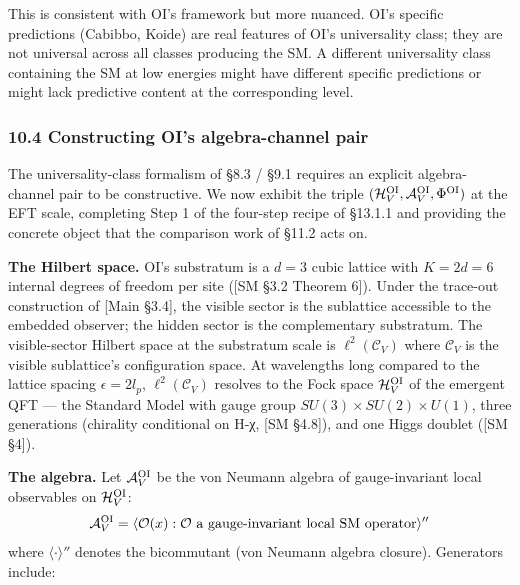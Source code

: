 \documentclass[
]{article}
\begin{document}
This is consistent with OI's framework but more nuanced. OI's specific
predictions (Cabibbo, Koide) are real features of OI's universality
class; they are not universal across all classes producing the SM. A
different universality class containing the SM at low energies might
have different specific predictions or might lack predictive content at
the corresponding level.

\hypertarget{constructing-ois-algebra-channel-pair}{%
\subsubsection{10.4 Constructing OI's algebra-channel
pair}\label{constructing-ois-algebra-channel-pair}}

The universality-class formalism of §8.3 / §9.1 requires an explicit
algebra-channel pair to be constructive. We now exhibit the triple
\((\mathcal{H}_V^{\rm OI}, \mathcal{A}_V^{\rm OI}, \Phi^{\rm OI})\) at
the EFT scale, completing Step 1 of the four-step recipe of §13.1.1 and
providing the concrete object that the comparison work of §11.2 acts on.

\textbf{The Hilbert space.} OI's substratum is a \(d = 3\) cubic lattice
with \(K = 2d = 6\) internal degrees of freedom per site ({[}SM §3.2
Theorem 6{]}). Under the trace-out construction of {[}Main §3.4{]}, the
visible sector is the sublattice accessible to the embedded observer;
the hidden sector is the complementary substratum. The visible-sector
Hilbert space at the substratum scale is \(\ell^2(\mathcal{C}_V)\) where
\(\mathcal{C}_V\) is the visible sublattice's configuration space. At
wavelengths long compared to the lattice spacing \(\epsilon = 2 l_p\),
\(\ell^2(\mathcal{C}_V)\) resolves to the Fock space
\(\mathcal{H}_V^{\rm OI}\) of the emergent QFT --- the Standard Model
with gauge group \(SU(3) \times SU(2) \times U(1)\), three generations
(chirality conditional on H-χ, {[}SM §4.8{]}), and one Higgs doublet
({[}SM §4{]}).

\textbf{The algebra.} Let \(\mathcal{A}_V^{\rm OI}\) be the von Neumann
algebra of gauge-invariant local observables on
\(\mathcal{H}_V^{\rm OI}\):
\[\mathcal{A}_V^{\rm OI} = \langle \mathcal{O}(x) : \mathcal{O} \text{ a gauge-invariant local SM operator}\rangle''\]
where \(\langle \cdot \rangle''\) denotes the bicommutant (von Neumann
algebra closure). Generators include:
\end{document}
